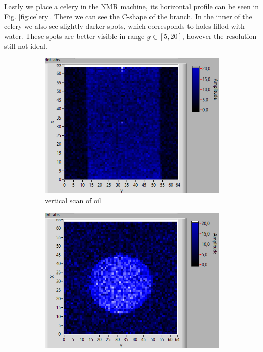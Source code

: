 Lastly we place a celery in the NMR machine, its horizontal profile can be seen in Fig. \ref{fig:celery}. There we can see the C-shape of the branch. In the inner of the celery we also see slightly darker spots, which corresponds to holes filled with water. These spots are better visible in range $y \in [5, 20]$, however the resolution still not ideal. 
\begin{figure}[H]
    \centering
    \begin{subfigure}[b]{0.45\textwidth}
        \centering
        \includegraphics[width=\textwidth]{./Latex images/oil_vertical.png}
        \caption{ vertical scan of oil}
        \label{fig:oil vertical}
    \end{subfigure}
    \hfill
    \begin{subfigure}[b]{0.45\textwidth}
        \centering
        \includegraphics[width=\textwidth]{./Latex images/oil_horizontal.png}

\end{subfigure}
\end{figure}
